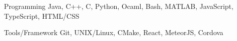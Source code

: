 

\begin{cvskills}

  \cvskill
    {Programming} %
    {Java, C++, C, Python, Ocaml, Bash, MATLAB, JavaScript, TypeScript, HTML/CSS} %

  \cvskill
    {Tools/Framework} %
    {Git, UNIX/Linux, CMake, React, MeteorJS, Cordova} %


\end{cvskills}